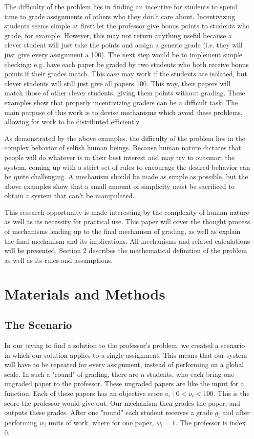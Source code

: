\documentclass[12pt, Arial]{article}
\begin{document}
The difficulty of the problem lies in finding an incentive for students to spend time to grade assignments of others who they don't care about. Incentivizing students seems simple at first: let the professor give bonus points to students who grade, for example. However, this may not return anything useful because a clever student will just take the points and assign a generic grade (i.e. they will just give every assignment a 100). The next step would be to implement simple checking: e.g. have each paper be graded by two students who both receive bonus points if their grades match. This case may work if the students are isolated, but clever students will still just give all papers 100. This way, their papers will match those of other clever students, giving them points without grading. These examples show that properly incentivizing graders can be a difficult task. The main purpose of this work is to devise mechanisms which avoid these problems, allowing for work to be distributed efficiently.

As demonstrated by the above examples, the difficulty of the problem lies in the complex behavior of selfish human beings. Because human nature dictates that people will do whatever is in their best interest and may try to outsmart the system, coming up with a strict set of rules to encourage the desired behavior can be quite challenging. A mechanism should be made as simple as possible, but the above examples show that a small amount of simplicity must be sacrificed to obtain a system that can't be manipulated.

This research opportunity is made interesting by the complexity of human nature as well as its necessity for practical use. This paper will cover the thought process of mechanisms leading up to the final mechanism of grading, as well as explain the final mechanism and its implications. All mechanisms and related calculations will be presented. Section 2 describes the mathematical definition of the problem as well as its rules and assumptions.

\section{Materials and Methods}
\subsection{The Scenario}
In our trying to find a solution to the professor's problem, we created a scenario in which our solution applies to a single assignment. This means that our system will have to be repeated for every assignment, instead of performing on a global scale. In such a "round" of grading, there are $n$ students, who each bring one ungraded paper to the professor. These ungraded papers are like the input for a function. Each of these papers has an objective score $o_i\mid 0<o_i<100$. This is the score the professor would give out. Our mechanism then grades the paper, and outputs these grades. After one "round" each student receives a grade $g_i$ and after performing $w_i$ units of work, where for one paper, $w_i=1$. The professor is index 0.
\end{document}
